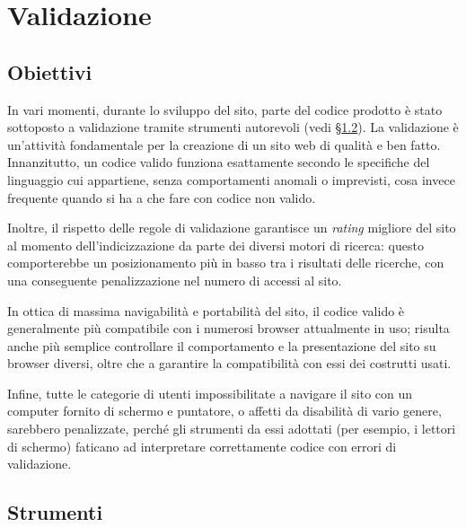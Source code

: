 \section{Validazione}
\label{validazione}

\subsection{Obiettivi}
\label{validazione-obiettivi}

In vari momenti, durante lo sviluppo del sito, parte del codice prodotto è stato sottoposto a validazione tramite strumenti autorevoli (vedi §\ref{validazione-strumenti}). La validazione è un'attività fondamentale per la creazione di un sito web di qualità e ben fatto. Innanzitutto, un codice valido funziona esattamente secondo le specifiche del linguaggio cui appartiene, senza comportamenti anomali o imprevisti, cosa invece frequente  quando si ha a che fare con codice non valido. 

Inoltre, il rispetto delle regole di validazione garantisce un \textit{rating} migliore del sito al momento dell'indicizzazione da parte dei diversi motori di ricerca: questo comporterebbe un posizionamento più in basso tra i risultati delle ricerche, con una conseguente penalizzazione nel numero di accessi al sito.

In ottica di massima navigabilità e portabilità del sito, il codice valido è generalmente più compatibile con i numerosi browser attualmente in uso; risulta anche più semplice controllare il comportamento e la presentazione del sito su browser diversi, oltre che a garantire la compatibilità con essi dei costrutti usati.

Infine, tutte le categorie di utenti impossibilitate a navigare il sito con un computer fornito di schermo e puntatore, o affetti da disabilità di vario genere, sarebbero penalizzate, perché gli strumenti da essi adottati (per esempio, i lettori di schermo) faticano ad interpretare correttamente codice con errori di validazione.


\subsection{Strumenti}
\label{validazione-strumenti}

